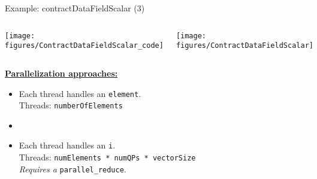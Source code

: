 \begin{frame}[fragile]{Example: contractDataFieldScalar (3)}

  \begin{columns}[t,onlytextwidth]
      \begin{center}
        \texttt{[image: figures/ContractDataFieldScalar\_code]}
      \end{center}
      \begin{center}
        \texttt{[image: figures/ContractDataFieldScalar]}
      \end{center}
  \end{columns}

  \vspace{10pt}

  \ul{\textbf{Parallelization approaches:}}

  \begin{itemize}[<+->]
    \item{Each thread handles an \texttt{element}. \\
              \hspace{20pt} Threads: \texttt{numberOfElements}}
    \item {}
    \item{Each thread handles an \texttt{i}. \\
              \hspace{20pt} Threads: \texttt{numElements * numQPs * vectorSize}\\
              \hspace{20pt} \emph{Requires a} \texttt{parallel\_reduce}.}
  \end{itemize}


\end{frame}


